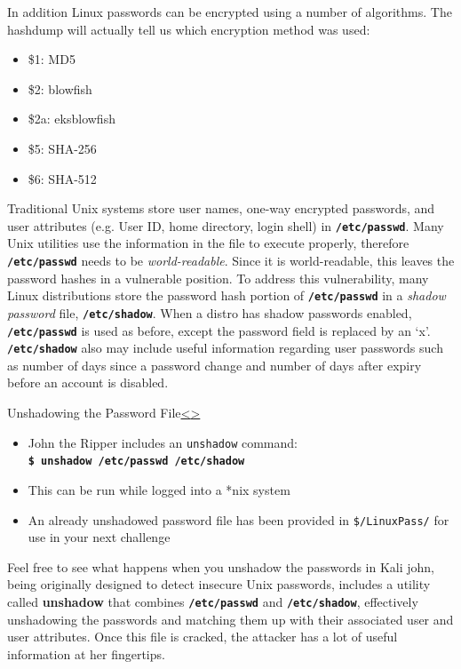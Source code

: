 \documentclass[12pt]{article}
\newcommand{\code}[1]{\texttt{\bfseries#1}}
\newenvironment{instructionblock}{\Large\bgroup}{\egroup}
\newcommand{\bi}{\begin{itemize}}
\newcommand{\ei}{\end{itemize}}
\begin{document}
In addition Linux passwords can be encrypted using a number of algorithms. The hashdump will actually tell us which encryption method was used:
\bi
	\item \$1: MD5
	\item \$2: blowfish
	\item \$2a: eksblowfish
	\item \$5: SHA-256
	\item \$6: SHA-512 
\ei
\vfill

Traditional Unix systems store user names, one-way encrypted passwords, and user attributes (e.g. User ID, home directory, login shell) in \code{/etc/passwd}. Many Unix utilities use the information in the file to execute properly, therefore \code{/etc/passwd} needs to be \textit{world-readable}. Since it is world-readable, this leaves the password hashes in a vulnerable position. To address this vulnerability, many Linux distributions store the password hash portion of \code{/etc/passwd} in a \textit{shadow password} file, \code{/etc/shadow}.
When a distro has shadow passwords enabled, \code{/etc/passwd} is used as before, except the password field is replaced by an `x'. \code{/etc/shadow} also may include useful information regarding user passwords such as number of days since a password change and number of days after expiry before an account is disabled. \cite{frampton}

\pagebreak
\begin{slide}{Unshadowing the Password File}{\hyperref[slide 18]{\textless}\hyperref[slide 20]{\textgreater}}
	\begin{instructionblock}
		\begin{itemize}
			\item John the Ripper includes an \texttt{unshadow} command:\\
			\code{\$ unshadow /etc/passwd /etc/shadow}
			\item This can be run while logged into a *nix system
			\item An already unshadowed password file has been provided in \texttt{\$/LinuxPass/} for use in your next challenge
		\end{itemize}
	\end{instructionblock}
\end{slide}
Feel free to see what happens when you unshadow the passwords in Kali
\vfill
john, being originally designed to detect insecure Unix passwords, includes a utility called \textbf{unshadow} that combines \code{/etc/passwd} and \code{/etc/shadow}, effectively unshadowing the passwords and matching them up with their associated user and user attributes. Once this file is cracked, the attacker has a lot of useful information at her fingertips. \cite{john}
\end{document}
